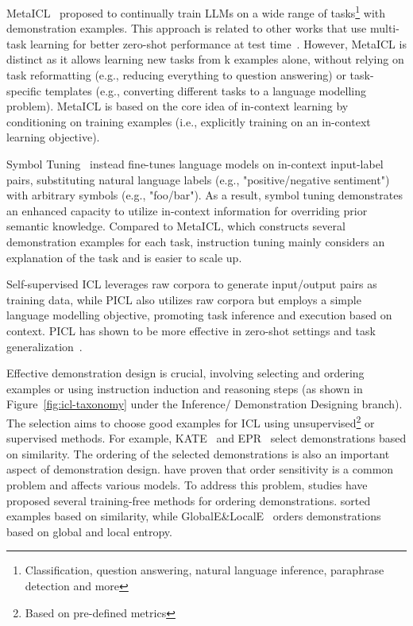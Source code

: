 MetaICL~\cite{min2022metaicl} proposed to continually train LLMs on a wide range of tasks\footnote{Classification, question answering,
	natural language inference, paraphrase detection and more} with demonstration examples.
This approach is related to other works that use multi-task learning for better zero-shot performance at test time~\cite{min2022metaicl}.
However, MetaICL is distinct as it allows learning new tasks from k examples alone, without relying on task reformatting (e.g., reducing everything to question answering)
or task-specific templates (e.g., converting different tasks to a language modelling problem).
MetaICL is based on the core idea of in-context learning by conditioning on training examples (i.e., explicitly training on an in-context learning objective).

Symbol Tuning~\cite{wei2023symbol} instead fine-tunes language models on in-context input-label pairs, substituting natural language labels (e.g., "positive/negative sentiment") with arbitrary symbols (e.g., "foo/bar").
As a result, symbol tuning demonstrates an enhanced capacity to utilize in-context information for overriding prior semantic knowledge.
Compared to MetaICL, which constructs several demonstration examples for each task, instruction tuning mainly considers an explanation of the task and is easier to scale up.

Self-supervised ICL leverages raw corpora to generate input/output pairs as training data, while PICL also utilizes raw corpora but employs a simple language modelling objective, promoting task inference and execution based on context.
PICL has shown to be more effective in zero-shot settings and task generalization~\cite{dong2023survey}.

Effective demonstration design is crucial, involving selecting and ordering examples or using instruction induction and reasoning steps (as shown in Figure~\ref{fig:icl-taxonomy} under the Inference/ Demonstration Designing branch).
The selection aims to choose good examples for ICL using unsupervised\footnote{Based on pre-defined metrics} or supervised methods.
For example, KATE~\cite{liu2022good} and EPR~\cite{rubin2022learning} select demonstrations based on similarity.
The ordering of the selected demonstrations is also an important aspect of demonstration design.
\textcite{lu2022fantastically} have proven that order sensitivity is a common problem and affects various models.
To address this problem, studies have proposed several training-free methods for ordering demonstrations.
\textcite{liu2022good} sorted examples based on similarity, while GlobalE\&LocalE~\cite{lu2022fantastically} orders demonstrations based on global and local entropy.

